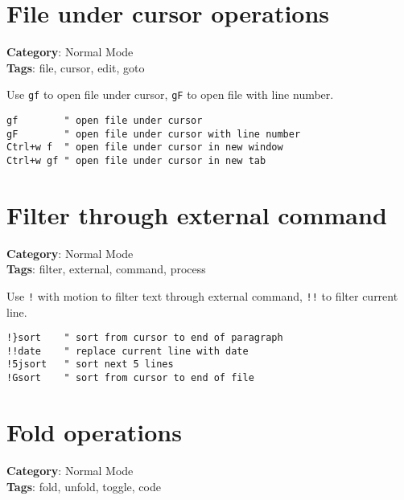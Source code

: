 {{{{{{{{{{\section{File under cursor operations}

\textbf{Category}: Normal Mode\\ \textbf{Tags}: file, cursor, edit, goto
\vspace{0.5cm}

Use {\footnotesize \Verb§gf§} to open file under cursor, {\footnotesize \Verb§gF§} to open file with line number.

\begin{Exa*}{}
\begin{Verbatim}[fontsize=\footnotesize, breaklines, breakanywhere]
gf        " open file under cursor
gF        " open file under cursor with line number
Ctrl+w f  " open file under cursor in new window
Ctrl+w gf " open file under cursor in new tab
\end{Verbatim}
\end{Exa*}

\section{Filter through external command}

\textbf{Category}: Normal Mode\\ \textbf{Tags}: filter, external, command, process
\vspace{0.5cm}

Use {\footnotesize \Verb§!§} with motion to filter text through external command, {\footnotesize \Verb§!!§} to filter current line.

\begin{Exa*}{}
\begin{Verbatim}[fontsize=\footnotesize, breaklines, breakanywhere]
!}sort    " sort from cursor to end of paragraph
!!date    " replace current line with date
!5jsort   " sort next 5 lines
!Gsort    " sort from cursor to end of file
\end{Verbatim}
\end{Exa*}

\section{Fold operations}

\textbf{Category}: Normal Mode\\ \textbf{Tags}: fold, unfold, toggle, code
\vspace{0.5cm}

}}}}}}}}}}
